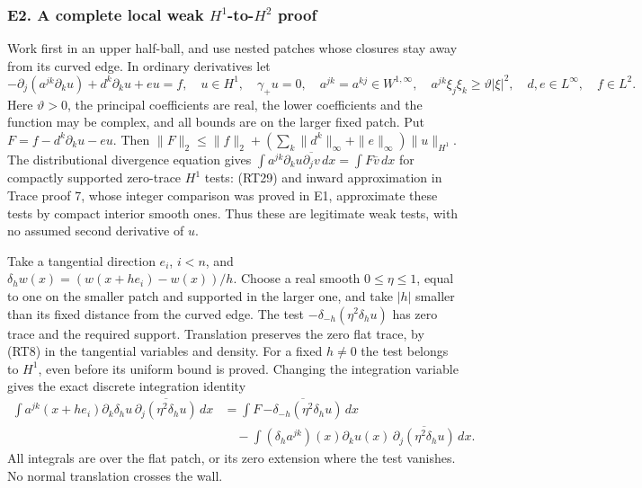 \documentclass[
  11pt,
]{article}
\makeatletter
\let\ReaderOriginalAnchorStart\hyper@anchorstart
\let\ReaderOriginalAnchorEnd\hyper@anchorend
\let\ReaderPendingAliases\@empty
\def\ReaderArmAliases#1{\gdef\ReaderPendingAliases{#1}}
\def\hyper@anchorstart#1{\ReaderIfNativeAnchorTF{#1}{\ReaderPendingAliases\global\let\ReaderPendingAliases\@empty}{}\ReaderOriginalAnchorStart{#1}}
\makeatother
\begin{document}
\ReaderArmAliases{\ReaderOriginalAnchorStart{e2.-a-complete-local-weak-h1-to-h2-proof}\ReaderOriginalAnchorEnd}
\subsubsection{\texorpdfstring{E2. A complete local weak
\(H^1\)-to-\(H^2\)
proof}{E2. A complete local weak H\^{}1-to-H\^{}2 proof}}\label{e2.-a-complete-local-weak-h1-to-h2-proof}

Work first in an upper half-ball, and use nested patches whose closures
stay away from its curved edge. In ordinary derivatives let {\fontsize{9.5pt}{11.5pt}\selectfont
\[
 -\partial_j(a^{jk}\partial_ku)+d^k\partial_ku+eu=f,
 \quad u\in H^1,\quad \gamma_+u=0,
 \quad a^{jk}=a^{kj}\in W^{1,\infty},\quad
 a^{jk}\xi_j\xi_k\geq\vartheta|\xi|^2,
 \quad d,e\in L^\infty,\quad f\in L^2.
 \tag{DSP-E1}
\]
} Here \(\vartheta>0\), the principal coefficients are real, the lower
coefficients and the function may be complex, and all bounds are on the
larger fixed patch. Put \(F=f-d^k\partial_ku-eu\). Then
\(\|F\|_2\leq\|f\|_2+(\sum_k\|d^k\|_\infty+\|e\|_\infty)\|u\|_{H^1}\).
The distributional divergence equation gives
\(\int a^{jk}\partial_ku\overline{\partial_jv}\,dx=\int F\overline v\,dx\)
for compactly supported zero-trace \(H^1\) tests: (RT29) and inward
approximation in Trace proof 7, whose integer comparison was proved in
E1, approximate these tests by compact interior smooth ones. Thus these
are legitimate weak tests, with no assumed second derivative of \(u\).

Take a tangential direction \(e_i\), \(i<n\), and
\(\delta_h w(x)=(w(x+he_i)-w(x))/h\). Choose a real smooth
\(0\leq\eta\leq1\), equal to one on the smaller patch and supported in
the larger one, and take \(|h|\) smaller than its fixed distance from
the curved edge. The test \(-\delta_{-h}(\eta^2\delta_hu)\) has zero
trace and the required support. Translation preserves the zero flat
trace, by (RT8) in the tangential variables and density. For a fixed
\(h\ne0\) the test belongs to \(H^1\), even before its uniform bound is
proved. Changing the integration variable gives the exact discrete
integration identity \[
 \begin{split}
 \int a^{jk}(x+he_i)\partial_k\delta_hu\,
                 \overline{\partial_j(\eta^2\delta_hu)}\,dx
 &=\int F\,\overline{-\delta_{-h}(\eta^2\delta_hu)}\,dx\\
 &\quad-\int(\delta_ha^{jk})(x)\partial_ku(x)\,
                  \overline{\partial_j(\eta^2\delta_hu)}\,dx.
 \end{split}\tag{DSP-E2}
\] All integrals are over the flat patch, or its zero extension where
the test vanishes. No normal translation crosses the wall.
\end{document}
